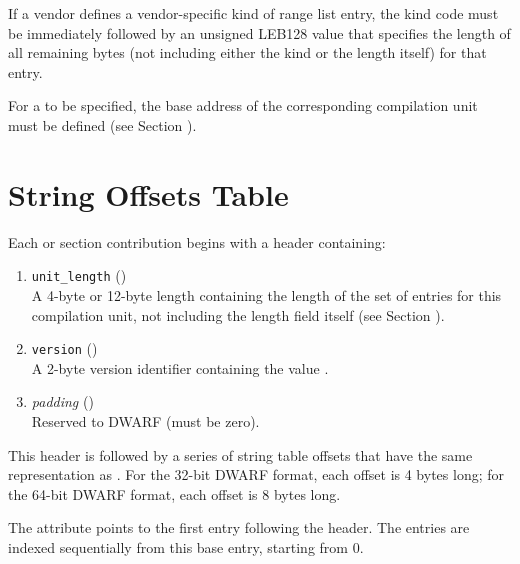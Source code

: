\bb
If a vendor defines a vendor-specific kind of range list
entry, the kind code must be immediately followed by an
unsigned LEB128 value that specifies the length of all
remaining bytes (not including either the kind or the length
itself) for that entry.
\eb

For a  to be specified, the base address of the
corresponding compilation unit must be defined 
(see Section ).

\section{String Offsets Table}
\label{chap:stringoffsetstable}
Each 
\bb
\dotdebugstroffsets{} or \dotdebugstroffsetsdwo{} section
contribution
\eb
begins with a header containing:
\begin{enumerate}[1. ]
\item \texttt{unit\_length} () \\
A 4-byte or 12-byte length containing the length of
the set of entries for this compilation unit, not
including the length field itself
\bb
(see Section ).
\eb

\item  \texttt{version} (\HFTuhalf) \\
A 2-byte version identifier containing the value
\versiondotdebugstroffsets{}.

\item \textit{padding} (\HFTuhalf) \\
Reserved to DWARF (must be zero).
\end{enumerate}

This header is followed by a series of string table offsets
that have the same representation as \DWFORMstrp.
For the 32-bit DWARF format, each offset is 4 bytes long; for
the 64-bit DWARF format, each offset is 8 bytes long.

The \DWATstroffsetsbase{} attribute points to the first
entry following the header. The entries are indexed
sequentially from this base entry, starting from 0.

